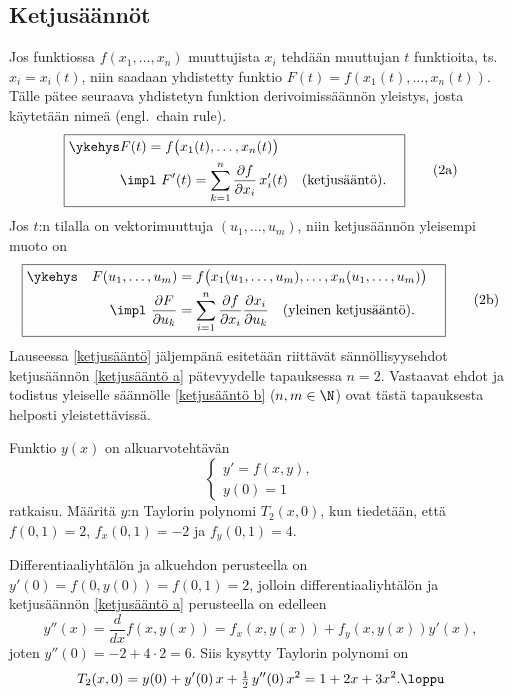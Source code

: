 \subsection*{Ketjusäännöt}

Jos funktiossa $f(x_1,\ldots,x_n)$ muuttujista $x_i$ tehdään muuttujan $t$ funktioita, ts.\
$x_i=x_i(t)$, niin saadaan yhdistetty funktio $F(t)=f(x_1(t),\ldots,x_n(t))$. Tälle pätee
seuraava yhdistetyn funktion derivoimissäännön yleistys, josta käytetään nimeä
\kor{ketjusääntö} (engl.\ chain rule).
\begin{equation} \label{ketjusääntö a}
\boxed{
\begin{aligned}
\ykehys &F(t) = f\bigl(x_1(t),\ldots,x_n(t)\bigr) \quad \\
  \quad &\impl \ F'(t) = \sum_{k=1}^n \frac{\partial f}{\partial x_i}\,x_i'(t) 
               \quad \text{(ketjusääntö)}. \quad
\end{aligned}} \tag{2a}
\end{equation}
Jos $t$:n tilalla on vektorimuuttuja $(u_1,\ldots,u_m)$, niin ketjusäännön yleisempi muoto on
\begin{equation} \label{ketjusääntö b}
\boxed{
\begin{aligned} \ykehys\quad 
F(u_1,\ldots,u_m) &= f\bigl(x_1(u_1,\ldots,u_m),\ldots,x_n(u_1,\ldots,u_m)\bigr) \quad \\
\impl \ \frac{\partial F}{\partial u_k} &= \sum_{i=1}^n \frac{\partial f}{\partial x_i}
\frac{\partial x_i}{\partial u_k} \quad \text{(yleinen ketjusääntö)}.
\end{aligned}} \tag{2b}
\end{equation}
Lauseessa \ref{ketjusääntö} jäljempänä esitetään riittävät sännöllisyysehdot ketjusäännön
\eqref{ketjusääntö a} pätevyydelle tapauksessa $n=2$. Vastaavat ehdot ja todistus yleiselle
säännölle \eqref{ketjusääntö b} ($n,m\in\N$) ovat tästä tapauksesta helposti yleistettävissä.
\begin{Exa} Funktio $y(x)$ on alkuarvotehtävän 
\[ \begin{cases} y' = f(x,y), \\ y(0)=1 \end{cases} \]
ratkaisu. Määritä $y$:n Taylorin polynomi $T_2(x,0)$, kun tiedetään, että $f(0,1)=2$,
$f_x(0,1)=-2$ ja $f_y(0,1)=4$.
\end{Exa}
\ratk Differentiaaliyhtälön ja alkuehdon perusteella on $y'(0)=f(0,y(0))=f(0,1)=2$, jolloin
differentiaaliyhtälön ja ketjusäännön \eqref{ketjusääntö a} perusteella on edelleen
\[ 
y''(x) = \frac{d}{dx} f(x,y(x)) = f_x(x,y(x)) + f_y(x,y(x))y'(x), 
\]
joten $y''(0) = -2 + 4 \cdot 2 = 6$. Siis kysytty Taylorin polynomi on
\[ 
T_2(x,0) = y(0) + y'(0)\,x + \tfrac{1}{2}\,y''(0)\,x^2 = 1+2x+3x^2. \loppu 
\]


